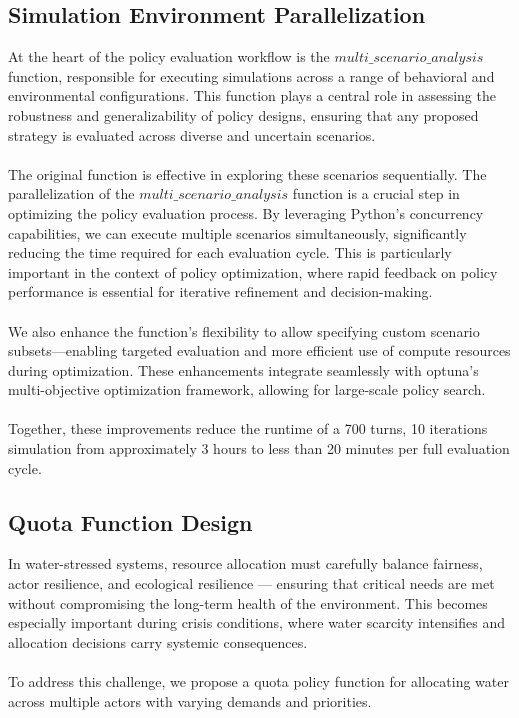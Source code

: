 \documentclass[ruler]{CUP-JNL-EDS}%
\begin{document}
\subsection{Simulation Environment Parallelization}
At the heart of the policy evaluation workflow is the $multi\_scenario\_analysis$ function, responsible 
for executing simulations across a range of behavioral and environmental configurations. This function 
plays a central role in assessing the robustness and generalizability of policy designs, ensuring that 
any proposed strategy is evaluated across diverse and uncertain scenarios. 
\\ \\
The original function is effective in exploring these scenarios sequentially. The parallelization of the 
$multi\_scenario\_analysis$ function is a crucial step in optimizing the policy evaluation process. 
By leveraging Python's concurrency capabilities, we can execute multiple scenarios simultaneously, 
significantly reducing the time required for each evaluation cycle. This is particularly important in the 
context of policy optimization, where rapid feedback on policy performance is essential for iterative 
refinement and decision-making.
\\ \\
We also enhance the function's flexibility to allow specifying custom scenario subsets—enabling 
targeted evaluation and more efficient use of compute resources during optimization. These enhancements 
integrate seamlessly with optuna’s multi-objective optimization framework, allowing for large-scale policy search.
\\ \\
Together, these improvements reduce the runtime of a 700 turns, 10 iterations simulation from approximately 
3 hours to less than 20 minutes per full evaluation cycle.

\subsection{Quota Function Design}
In water-stressed systems, resource allocation must carefully balance fairness, actor resilience, and 
ecological resilience — ensuring that critical needs are met without compromising the long-term health 
of the environment. This becomes especially important during crisis conditions, where water scarcity 
intensifies and allocation decisions carry systemic consequences.
\\ \\
\noindent To address this challenge, we propose a quota policy function for allocating water across multiple actors 
with varying demands and priorities. 
\end{document}
